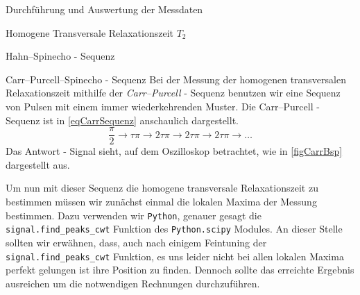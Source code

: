 \documentclass[pdftex, a4paper,11pt, twoside, ngerman]{report}
\begin{document}
\begin{chapter}{Durchführung und Auswertung der Messdaten}
\begin{section}{
        Homogene Transversale Relaxationszeit $T_{2}$}
\begin{subsection}{Hahn--Spinecho - Sequenz}
      \end{subsection}
      
      
      
      \begin{subsection}{Carr--Purcell--Spinecho - Sequenz}
        \label{chpHomoTransRelaxCarr}
        Bei der Messung der homogenen transversalen Relaxationszeit mithilfe der
        \textit{Carr--Purcell} - Sequenz benutzen wir eine Sequenz von
        Pulsen mit einem immer wiederkehrenden Muster.
        Die Carr--Purcell - Sequenz ist in \cref{eqCarrSequenz} anschaulich
        dargestellt.
        \begin{equation}
          \label{eqCarrSequenz}
          \frac{\pi}{2} \rightarrow \tau\pi \rightarrow 2\tau\pi \rightarrow
          2\tau\pi \rightarrow 2\tau\pi \rightarrow \ldots
        \end{equation}
        Das Antwort - Signal sieht, auf dem Oszilloskop betrachtet, wie in
        \cref{figCarrBsp} dargestellt aus.
        
        Um nun mit dieser Sequenz die homogene transversale Relaxationszeit
        zu bestimmen müssen wir zunächst einmal die lokalen Maxima der Messung
        bestimmen.
        Dazu verwenden wir \texttt{Python}, genauer gesagt die
        \texttt{signal.find\_peaks\_cwt} Funktion des \texttt{Python.scipy}
        Modules.
        An dieser Stelle sollten wir erwähnen, dass, auch nach einigem
        Feintuning der \texttt{signal.find\_peaks\_cwt} Funktion, es uns leider
        nicht bei allen lokalen Maxima perfekt gelungen ist ihre Position zu
        finden.
        Dennoch sollte das erreichte Ergebnis ausreichen um die notwendigen
        Rechnungen durchzuführen.
        

\end{subsection}
\end{section}
\end{chapter}
\end{document}
